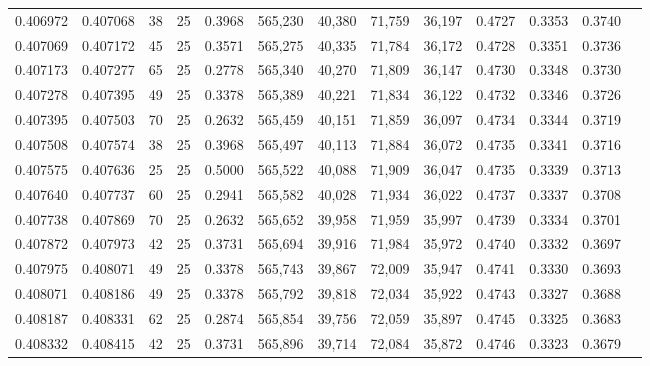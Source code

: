 \begin{tabular}{rrrrrrrrrrrrr}
0.406972 & 0.407068 &    38 &  25 &                                     0.3968 & 565,230 &  40,380 &  71,759 &  36,197 & 0.4727 & 0.3353 & 0.3740 \\
0.407069 & 0.407172 &    45 &  25 &                                     0.3571 & 565,275 &  40,335 &  71,784 &  36,172 & 0.4728 & 0.3351 & 0.3736 \\
0.407173 & 0.407277 &    65 &  25 &                                     0.2778 & 565,340 &  40,270 &  71,809 &  36,147 & 0.4730 & 0.3348 & 0.3730 \\
0.407278 & 0.407395 &    49 &  25 &                                     0.3378 & 565,389 &  40,221 &  71,834 &  36,122 & 0.4732 & 0.3346 & 0.3726 \\
0.407395 & 0.407503 &    70 &  25 &                                     0.2632 & 565,459 &  40,151 &  71,859 &  36,097 & 0.4734 & 0.3344 & 0.3719 \\
0.407508 & 0.407574 &    38 &  25 &                                     0.3968 & 565,497 &  40,113 &  71,884 &  36,072 & 0.4735 & 0.3341 & 0.3716 \\
0.407575 & 0.407636 &    25 &  25 &                                     0.5000 & 565,522 &  40,088 &  71,909 &  36,047 & 0.4735 & 0.3339 & 0.3713 \\
0.407640 & 0.407737 &    60 &  25 &                                     0.2941 & 565,582 &  40,028 &  71,934 &  36,022 & 0.4737 & 0.3337 & 0.3708 \\
0.407738 & 0.407869 &    70 &  25 &                                     0.2632 & 565,652 &  39,958 &  71,959 &  35,997 & 0.4739 & 0.3334 & 0.3701 \\
0.407872 & 0.407973 &    42 &  25 &                                     0.3731 & 565,694 &  39,916 &  71,984 &  35,972 & 0.4740 & 0.3332 & 0.3697 \\
0.407975 & 0.408071 &    49 &  25 &                                     0.3378 & 565,743 &  39,867 &  72,009 &  35,947 & 0.4741 & 0.3330 & 0.3693 \\
0.408071 & 0.408186 &    49 &  25 &                                     0.3378 & 565,792 &  39,818 &  72,034 &  35,922 & 0.4743 & 0.3327 & 0.3688 \\
0.408187 & 0.408331 &    62 &  25 &                                     0.2874 & 565,854 &  39,756 &  72,059 &  35,897 & 0.4745 & 0.3325 & 0.3683 \\
0.408332 & 0.408415 &    42 &  25 &                                     0.3731 & 565,896 &  39,714 &  72,084 &  35,872 & 0.4746 & 0.3323 & 0.3679 \\

\end{tabular}
